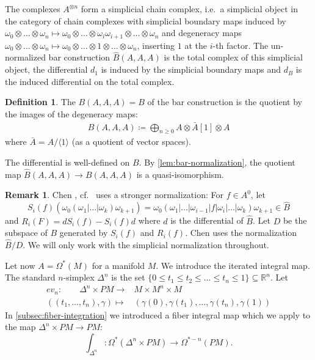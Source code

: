 \documentclass{scrartcl}
\let\emph\relax
\theoremstyle{plain}
\theoremstyle{definition}
\newtheorem{definition}[theorem]{Definition}
\newtheorem{remark}[theorem]{Remark}
\newcommand{\R}{\mathbb R}
\renewcommand{\subset}{\subseteq}
\newcommand{\defeq}{\coloneqq}
\begin{document}
The complexes $A^{\otimes n}$ form a simplicial chain complex, i.e.\ a simplicial object in the category of chain complexes with simplicial boundary maps induced by $\omega_0\otimes\dots\otimes\omega_n\mapsto \omega_0\otimes\dots\otimes\omega_i\omega_{i+1}\otimes\dots\otimes\omega_n$ and degeneracy maps $\omega_0\otimes\dots\otimes\omega_n\mapsto \omega_0\otimes\dots\otimes 1\otimes\dots\otimes\omega_n$, inserting $1$ at the $i$-th factor. 
The un-normalized bar construction $\hat B(A, A, A)$ is the total complex of this simplicial object, the differential $d_1$ is induced by the simplicial boundary maps and $d_B$ is the induced differential on the total complex.
\begin{definition}
    The \emph{simplicial normalization} $B(A, A, A) = B$ of the bar construction is the quotient by the images of the degeneracy maps:
\begin{align*}
    B(A, A, A) \defeq \bigoplus_{n\geq 0} A\otimes \bar A[1]\otimes A
\end{align*}
where $\bar A = A / \langle 1\rangle$ (as a quotient of vector spaces).
\end{definition}
The differential is well-defined on $B$. By \cref{lem:bar-normalization}, the quotient map $\hat B(A, A, A)\to B(A, A, A)$ is a quasi-isomorphism. 

\begin{remark}
Chen \cite{chen1976reduced}, cf.\ \cite{getzler1991differential} uses a stronger normalization: For $f\in A^0$, let $$S_i(f)\left(\omega_0(\omega_1| \dots| \omega_k)\omega_{k+1}\right) = \omega_0(\omega_1| \dots |\omega_{i-1}| f | \omega_i| \dots| \omega_k)\omega_{k+1}\in \hat B$$ and $R_i(F) = d S_i(f) - S_i(f) d$ where $d$ is the differential of $\hat B$. Let $D$ be the subspace of $B$ generated by $S_i(f)$ and $R_i(f)$. Chen uses the normalization $\hat B/D$. We will only work with the simplicial normalization throughout. 
\end{remark}

Let now $A=\Omega^*(M)$ for a manifold $M$. We introduce the iterated integral map. The standard $n$-simplex $\Delta^n$ is the set $\{0\leq t_1\leq t_2\leq \dots\leq t_n\leq 1\} \subset \R^n$. Let 
\begin{align*}
    ev_n\colon\qquad\Delta^n\times PM \to & M\times M^n\times M \\
    ((t_1,\dots, t_n), \gamma)\mapsto &(\gamma(0), \gamma(t_1), \dots, \gamma(t_n), \gamma(1))
\end{align*}
In \cref{subsec:fiber-integration} we introduced a fiber integral map which we apply to the map $\Delta^n \times PM \to PM$: 
$$\int_{\Delta^n}\colon \Omega^*(\Delta^n \times PM) \to \Omega^{*-n}(PM).$$
\end{document}
